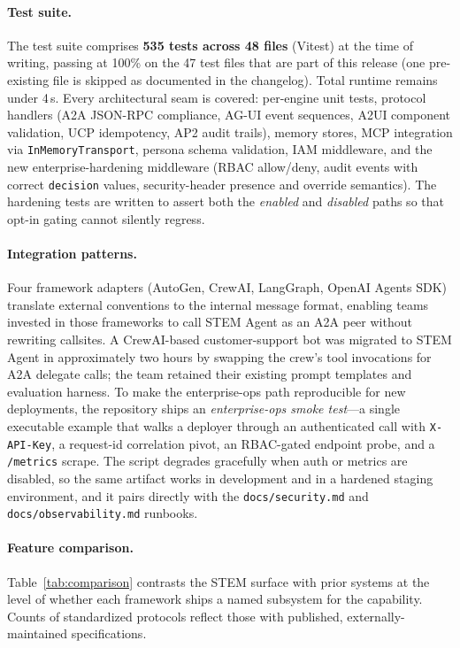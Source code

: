 \documentclass[11pt]{article}
\begin{document}
\paragraph{Test suite.} The test suite comprises \textbf{535 tests across 48 files} (Vitest) at the time of writing, passing at 100\% on the 47 test files that are part of this release (one pre-existing file is skipped as documented in the changelog). Total runtime remains under 4\,s. Every architectural seam is covered: per-engine unit tests, protocol handlers (A2A JSON-RPC compliance, AG-UI event sequences, A2UI component validation, UCP idempotency, AP2 audit trails), memory stores, MCP integration via \texttt{InMemoryTransport}, persona schema validation, IAM middleware, and the new enterprise-hardening middleware (RBAC allow/deny, audit events with correct \texttt{decision} values, security-header presence and override semantics). The hardening tests are written to assert both the \emph{enabled} and \emph{disabled} paths so that opt-in gating cannot silently regress.

\paragraph{Integration patterns.} Four framework adapters (AutoGen, CrewAI, LangGraph, OpenAI Agents SDK) translate external conventions to the internal message format, enabling teams invested in those frameworks to call STEM Agent as an A2A peer without rewriting callsites. A CrewAI-based customer-support bot was migrated to STEM Agent in approximately two hours by swapping the crew's tool invocations for A2A delegate calls; the team retained their existing prompt templates and evaluation harness. To make the enterprise-ops path reproducible for new deployments, the repository ships an \emph{enterprise-ops smoke test}---a single executable example that walks a deployer through an authenticated call with \texttt{X-API-Key}, a request-id correlation pivot, an RBAC-gated endpoint probe, and a \texttt{/metrics} scrape. The script degrades gracefully when auth or metrics are disabled, so the same artifact works in development and in a hardened staging environment, and it pairs directly with the \texttt{docs/security.md} and \texttt{docs/observability.md} runbooks.

\paragraph{Feature comparison.} Table~\ref{tab:comparison} contrasts the STEM surface with prior systems at the level of whether each framework ships a named subsystem for the capability. Counts of standardized protocols reflect those with published, externally-maintained specifications.
\end{document}
